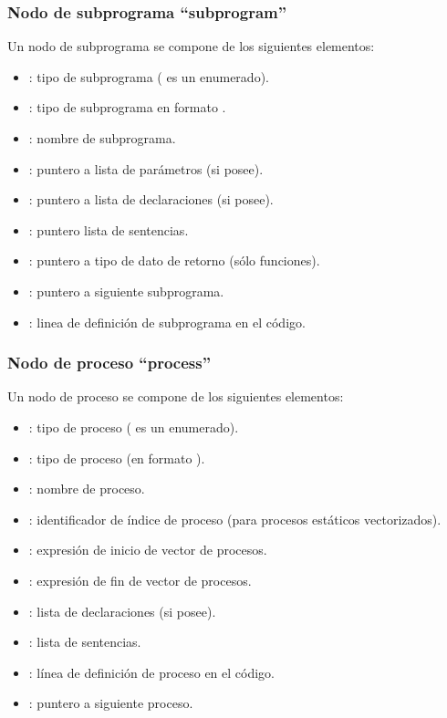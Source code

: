 \subsubsection{Nodo de subprograma ``subprogram''}
\noindent
Un nodo de subprograma se compone de los siguientes elementos:
\begin{itemize}
    \item {}: tipo de subprograma ( es un enumerado).
    \item {}: tipo de subprograma en formato .
    \item {}: nombre de subprograma.
    \item {}: puntero a lista de parámetros (si posee).
    \item {}: puntero a lista de declaraciones (si posee).
    \item {}: puntero  lista de sentencias.
    \item {}: puntero a tipo de dato de retorno (sólo funciones).
    \item {}: puntero a siguiente subprograma.
    \item {}: linea de definición de subprograma en el código.
\end{itemize}

\subsubsection{Nodo de proceso ``process''}
\noindent
Un nodo de proceso se compone de los siguientes elementos:
\begin{itemize}
    \item {}: tipo de proceso ( es un enumerado).
    \item {}: tipo de proceso (en formato ).
    \item {}: nombre de proceso.
    \item {}: identificador de índice de proceso (para procesos estáticos vectorizados).
    \item {}: expresión de inicio de vector de procesos.
    \item {}: expresión de fin de vector de procesos.
    \item {}: lista de declaraciones (si posee).
    \item {}: lista de sentencias.
    \item {}: línea de definición de proceso en el código.
    \item {}: puntero a siguiente proceso.
\end{itemize}

